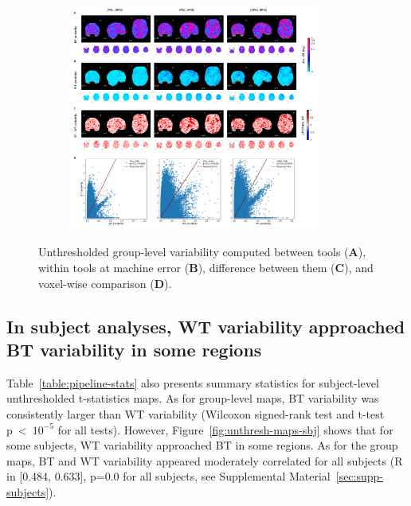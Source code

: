 \documentclass[11pt,onecolumn]{article}
\begin{document}
\begin{figure}[ht]
  \centering
  \begin{subfigure}[ht]{0.9\textwidth}
    \centering
    \includegraphics[width=0.9\textwidth]{figures/abs/gl-unthresh.png}
  \end{subfigure}
  \caption{Unthresholded group-level variability computed between tools
    (\textbf{A}), within tools at machine error (\textbf{B}), difference
    between them (\textbf{C}), and voxel-wise comparison (\textbf{D}). }
  \label{fig:unthresh-maps}
\end{figure}

\subsection{In subject analyses, WT variability approached BT variability in some regions}

Table~\ref{table:pipeline-stats} also presents summary statistics for
subject-level unthresholded t-statistics maps. As for group-level maps,
BT variability was consistently larger than WT variability (Wilcoxon
signed-rank test and t-test p~\textless~$10^{-5}$ for all tests).
However, Figure~\ref{fig:unthresh-maps-sbj} shows that for
some subjects, WT variability approached %
BT in some regions. As for the group maps, BT and WT
variability appeared moderately correlated for all subjects (R in [0.484,
    0.633], p=0.0 for all subjects, see Supplemental Material~\ref{sec:supp-subjects}).
\end{document}

